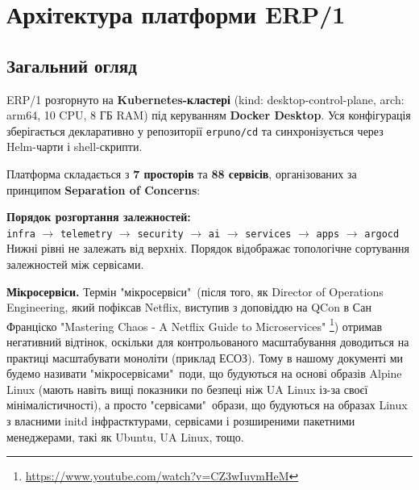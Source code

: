 \documentclass[12pt,a4paper]{article}
\begin{document}
\newpage
\section{Архітектура платформи ERP/1}

\subsection{Загальний огляд}

ERP/1 розгорнуто на \textbf{Kubernetes-кластері} (kind: desktop-control-plane,
arch: arm64, 10 CPU, 8 ГБ RAM) під керуванням \textbf{Docker Desktop}.
Уся конфігурація зберігається декларативно у репозиторії \texttt{erpuno/cd}
та синхронізується через Helm-чарти і shell-скрипти.

Платформа складається з \textbf{7 просторів} та \textbf{88 сервісів},
організованих за принципом \textbf{Separation of Concerns}:

\vspace{10pt}
\begin{tcolorbox}[notebox]
\textbf{Порядок розгортання залежностей:}\\[4pt]
              \texttt{infra}
$\rightarrow$ \texttt{telemetry}
$\rightarrow$ \texttt{security}
$\rightarrow$ \texttt{ai}
$\rightarrow$ \texttt{services}
$\rightarrow$ \texttt{apps}
$\rightarrow$ \texttt{argocd} \\[4pt]
\footnotesize Нижні рівні не залежать від верхніх.
Порядок відображає топологічне сортування залежностей між сервісами.
\end{tcolorbox}

\begin{tcolorbox}[notebox]
\textbf{Мікросервіси.}
Термін "мікросервіси"\ (після того, як Director of Operations Engineering, який пофіксав Netflix,
виступив з доповіддю на QCon в Сан Франціско "Mastering Chaos - A Netflix Guide to Microservices"
\footnote{\url{https://www.youtube.com/watch?v=CZ3wIuvmHeM}}) отримав негативний відтінок, оскільки для контрольованого
масштабування доводиться на практиці масштабувати моноліти (приклад ЕСОЗ). Тому в нашому документі ми будемо
називати "мікросервісами"\ поди, що будуються на основі образів Alpine Linux (мають навіть вищі показники
по безпеці ніж UA Linux із-за своєї мінімалістичності), а просто "сервісами"\ образи, що будуються на образах Linux
з власними initd інфрастктурами, сервісами і розширеними пакетними менеджерами, такі як Ubuntu, UA Linux, тощо.
\end{tcolorbox}
\end{document}
